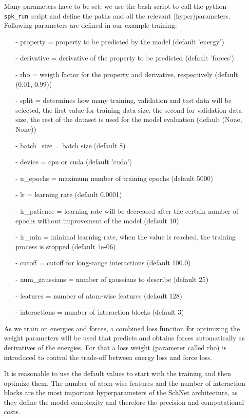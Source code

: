 Many parameters have to be set; we use the bash script to call the python 
\texttt{spk\_run} script and define the paths and all the relevant (hyper)parameters.
Following parameters are defined in our example training:
\begin{enumerate}
    \item[-] property = property to be predicted by the model (default 'energy')
    \item[-] derivative = derivative of the property to be predicted (default 'forces')
    \item[-] rho = weigth factor for the property and derivative, respectively (default (0.01, 0.99))
    \item[-] split = determines how many training, validation and test data will be selected, the first value for training data size, the second for validation data size, the rest of the dataset is used for the model evaluation (default (None, None))
    \item[-] batch\_size = batch size (default 8)
    \item[-] device = cpu or cuda (default 'cuda')
    \item[-] n\_epochs = maximum number of training epochs (default 5000)
    \item[-] lr = learning rate (default 0.0001)
    \item[-] lr\_patience = learning rate will be decreased after the certain number of epochs without improvement of the model (default 10)
    \item[-] lr\_min = minimal learning rate, when the value is reached, the training process is stopped (default 1e-06)
    \item[-] cutoff = cutoff for long-range interactions (default 100.0)
    \item[-] num\_gaussians = number of gaussians to describe (default 25)
    \item[-] features = number of atom-wise features (default 128)
    \item[-] interactions = number of interaction blocks (default 3)
\end{enumerate}

As we train on energies and forces, a combined loss function for optimizing the weight parameters will be used that predicts and obtains forces automatically as derivatives of the energies. For that a loss weight (parameter called rho) is introduced to control the trade-off between energy loss and force loss.

It is reasonable to use the default values to start with the training and then optimize them. The number of atom-wise features and the number of interaction blocks are the most important hyperparameters of the SchNet architecture, as they define the model complexity and therefore the precision and computational costs. 

